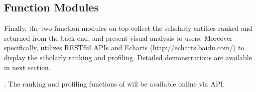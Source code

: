 \subsection{Function Modules}
Finally, the two function modules on top collect the scholarly entities ranked and returned from the back-end, and present visual analysis to users. Moreover specifically, \oursystem utilizes RESTful APIs  and Echarts {\scriptsize (http://echarts.baidu.com/)} to display the scholarly ranking and profiling. Detailed demonstrations are available in next section.

. The ranking and profiling functions of \oursystem will be available online via API. 






